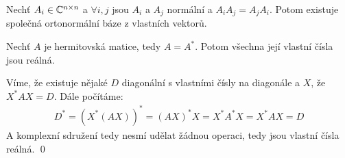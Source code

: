 \vt Nechť $A_i \in \mathbb{C}^{n\times n}$ a $\forall i,j$ jsou $A_i$ a $A_j$ normální a $A_iA_j = A_j A_i$. Potom existuje společná ortonormální báze z vlastních vektorů.

\dk {}

\vt Nechť $A$ je hermitovská matice, tedy $A = A^*$. Potom všechna její vlastní čísla jsou reálná.

\dk Víme, že existuje nějaké $D$ diagonální s vlastními čísly na diagonále a $X$, že $X^*AX = D$. Dále počítáme:
\begin{align}
	D^* = (X^*(AX))^* = (AX)^*X = X^*A^*X = X^*AX = D
\end{align}
A komplexní sdružení tedy nesmí udělat žádnou operaci, tedy jsou vlastní čísla reálná. \qed


